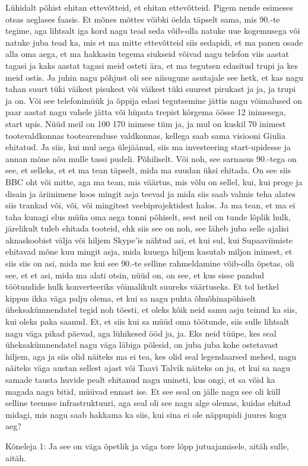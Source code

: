 Lühidalt põhist ehitan ettevõtteid, et ehitan ettevõtteid. Pigem nende esimeses otsas aeglases faasis. Et mõnes mõttes võibki öelda täpselt sama, mis 90.-te tegime, aga lihtsalt iga kord nagu tead seda võib-olla natuke uue kogemusega või natuke juba tead ka, mis et ma mitte ettevõtteid siis sedapidi, et ma panen osade alla oma aega, et ma hakkasin tegema siukseid võivad nagu telefon viis aastat tagasi ja kaks aastat tagasi meid osteti ära, et ma tegutsen edasitud trupi ja kes meid ostis. Ja juhin nagu põhjust oli see niisugune asutajale see hetk, et kas nagu tahan suurt tüki väikest pisukest või väikest tüki suurest pirukast ja ja, ja trupi ja on. Või see telefonimüük ja õppija edasi tegutsemine jättis nagu võimalused on paar aastat nagu vahele jätta või hüpata trepist kõrgema öösse 12 inimesega, start upis. Nüüd meil on 100 170 inimese tiim ja, ja mul on kuskil 70 inimest tootevaldkonnas tootearenduse valdkonnas, kellega saab sama visiooni Giulia ehitatud. Ja siis, kui mul aega ülejäänud, siis ma investeering start-upidesse ja annan mõne nõu mulle tassi pudeli. Põhiliselt. Või noh, see sarnasus 90.-tega on see, et selleks, et et ma tean täpselt, mida ma suudan üksi ehitada. On see siis BBC oht või mitte, aga ma tean, mis väärtus, mis võlu on sellel, kui, kui proge ja disain ja äriinimene koos mingit asja teevad ja mida siis saab valmis teha alates siis trankad või, või, või mingitest veebiprojektidest halos. Ja ma tean, et ma ei taha kunagi elus müüa oma aega tonni põhiselt, sest neil on tunde lõplik hulk, järelikult tuleb ehitada tooteid, ehk siis see on noh, see läheb juba selle ajalisi aknaskoobist välja või hiljem Skype'is nähtud asi, et kui sul, kui Supaaviimiste ehitavad mõne kuu mingit asja, mida kuuega hiljem kasutab miljon inimest, et siis siis on asi, mida me kui see 90.-te selline rahmeldamine võib-olla õpetas, oli see, et et asi, mida ma alati otsin, nüüd on, on see, et kus sisse pandud töötundide hulk konverteeriks võimalikult suureks väärtuseks. Et tol hetkel kippus ikka väga palju olema, et kui sa nagu puhta õhuõhinapõhiselt üheksakümnendatel tegid noh tõesti, et oleks kõik neid samu asju teinud ka siis, kui oleks paka saanud. Et, et siis kui sa müüd oma töötunde, siis sulle lihtsalt nagu väga pikad päevad, aga lühikesed ööd ja, ja.
Eks neid tüüpe, kes seal üheksakümnendatel nagu väga läbiga põlesid, on juba juba kohe ostetavast hiljem, aga ja siis olid näiteks ma ei tea, kes olid seal legendaarsed mehed, nagu näiteks väga austan sellest ajast või Taavi Talvik näiteks on ju, et kui sa nagu samade tausta huvide pealt ehitanud nagu unineti, kus ongi, et sa võid ka magada nagu bitid, müüvad ennast ise. Et see seal on jälle nagu see oli küll selline teenuse infrastruktuuri, aga seal oli see nagu alge olemas, kuidas ehitad midagi, mis nagu saab hakkama ka siis, kui sina ei ole näppupidi juures kogu aeg?
                 
Kõneleja 1:
Ja see on väga õpetlik ja väga tore lõpp jutuajamisele, aitäh sulle, aitäh.
